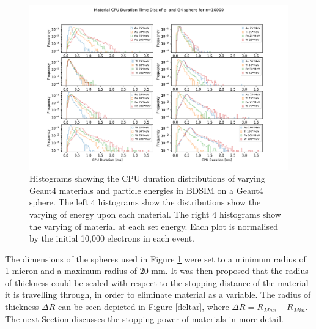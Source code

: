 \documentclass[12pt,a4paper]{article}
\begin{document}
\begin{figure}[h!]
\centering
\includegraphics[scale=0.6]{Images//Materials//not_Varied_by_radius_and_secondaries.pdf}
\caption[width=\columnwidth]{Histograms showing the CPU duration distributions of varying Geant4 materials and particle energies in BDSIM on a Geant4 sphere. The left 4 histograms show the distributions show the varying of energy upon each material. The right 4 histograms show the varying of material at each set energy. Each plot is normalised by the initial 10,000 electrons in each event.}
\label{novar}
\end{figure}

\noindent The dimensions of the spheres used in Figure \ref{novar} were set to a minimum radius of 1 micron and a maximum radius of 20 mm. It was then proposed that the radius of thickness could be scaled with respect to the stopping distance of the material it is travelling through, in order to eliminate material as a variable. The radius of thickness $\Delta R$ can be seen depicted in Figure \ref{deltar}, where $\Delta R = R_{Max} - R_{Min}$. The next Section discusses the stopping power of materials in more detail.
\end{document}
